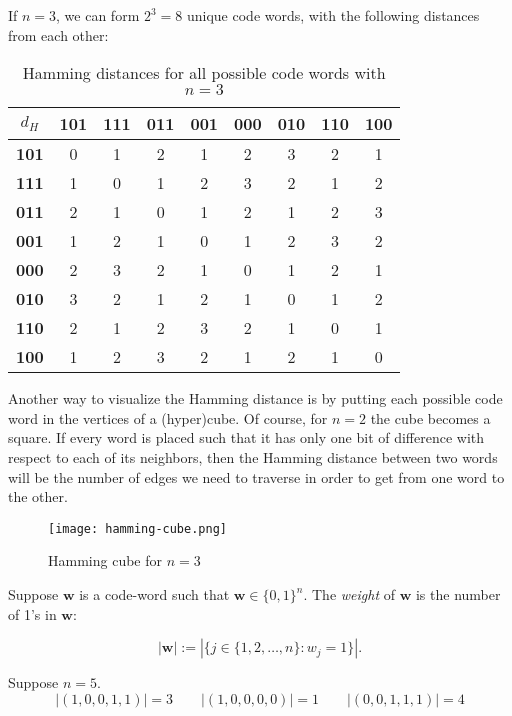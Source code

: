 \begin{example}
If $n = 3$, we can form $2^3=8$ unique code words, with the following distances from each other:

\begin{table}[!ht]
    \centering
    \begin{tabular}{|c|c|c|c|c|c|c|c|c|}
    \hline
        \textbf{$d_H$} & \textbf{101} & \textbf{111} & \textbf{011} & \textbf{001} & \textbf{000} & \textbf{010} & \textbf{110} & \textbf{100} \\ \hline
        \textbf{101} & 0 & 1 & 2 & 1 & 2 & 3 & 2 & 1 \\ \hline
        \textbf{111} & 1 & 0 & 1 & 2 & 3 & 2 & 1 & 2 \\ \hline
        \textbf{011} & 2 & 1 & 0 & 1 & 2 & 1 & 2 & 3 \\ \hline
        \textbf{001} & 1 & 2 & 1 & 0 & 1 & 2 & 3 & 2 \\ \hline
        \textbf{000} & 2 & 3 & 2 & 1 & 0 & 1 & 2 & 1 \\ \hline
        \textbf{010} & 3 & 2 & 1 & 2 & 1 & 0 & 1 & 2 \\ \hline
        \textbf{110} & 2 & 1 & 2 & 3 & 2 & 1 & 0 & 1 \\ \hline
        \textbf{100} & 1 & 2 & 3 & 2 & 1 & 2 & 1 & 0 \\ \hline
    \end{tabular}
    \caption{Hamming distances for all possible code words with $n=3$}
\end{table}

Another way to visualize the Hamming distance is by putting each possible code word in the vertices of a (hyper)cube. Of course, for $n=2$ the cube becomes a square. If every word is placed such that it has only one bit of difference with respect to each of its neighbors, then the Hamming distance between two words will be the number of edges we need to traverse in order to get from one word to the other.

\begin{figure}
    \centering
    \texttt{[image: hamming-cube.png]}
\caption{Hamming cube for $n=3$}
\end{figure}

\end{example}

\begin{definition}
Suppose $\textbf{w}$ is a code-word such that $\textbf{w} \in \{0,1\}^n$. The \emph{weight} of $\textbf{w}$ is the number of 1's in $\textbf{w}$:

\begin{equation}
    |\textbf{w}| := |\{j \in \{1, 2, \ldots, n\} : w_j = 1\}|.
\end{equation}

\end{definition}
\begin{example}
Suppose $n=5$.
\begin{equation*}
    |(1, 0, 0, 1, 1)| = 3 \quad\quad |(1, 0, 0, 0, 0)| = 1 \quad\quad |(0, 0, 1, 1, 1)| = 4
\end{equation*}
\end{example}

